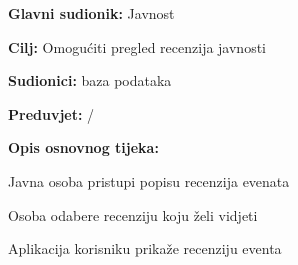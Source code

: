 				
				\noindent {}
				\begin{packed_item}
	
						\item \textbf{Glavni sudionik: }Javnost
						\item  \textbf{Cilj:} Omogućiti pregled recenzija javnosti
						\item  \textbf{Sudionici:} baza podataka
						\item  \textbf{Preduvjet:} /
						\item  \textbf{Opis osnovnog tijeka:}
						
						\item[] \begin{packed_enum}
	
							\item Javna osoba pristupi popisu recenzija evenata
							\item Osoba odabere recenziju koju želi vidjeti
							\item Aplikacija korisniku prikaže recenziju eventa
						\end{packed_enum}
				\end{packed_item}

